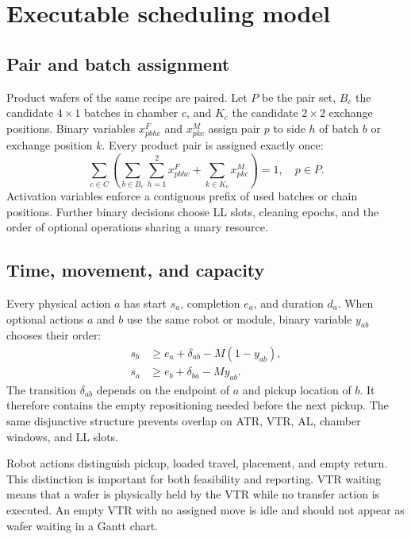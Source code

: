 \documentclass[5p,times,procedia]{elsarticle}
\begin{document}
\section{Executable scheduling model}

\subsection{Pair and batch assignment}

Product wafers of the same recipe are paired. Let $P$ be the pair set, $B_c$ the candidate $4\times1$ batches in chamber $c$, and $K_c$ the candidate $2\times2$ exchange positions. Binary variables $x^{F}_{pbhc}$ and $x^{M}_{pkc}$ assign pair $p$ to side $h$ of batch $b$ or exchange position $k$. Every product pair is assigned exactly once:
\begin{equation}
\sum_{c\in C}\left(\sum_{b\in B_c}\sum_{h=1}^{2}x^{F}_{pbhc}
+\sum_{k\in K_c}x^{M}_{pkc}\right)=1,\quad p\in P.
\label{eq:assignment}
\end{equation}
Activation variables enforce a contiguous prefix of used batches or chain positions. Further binary decisions choose LL slots, cleaning epochs, and the order of optional operations sharing a unary resource.

\subsection{Time, movement, and capacity}

Every physical action $a$ has start $s_a$, completion $e_a$, and duration $d_a$. When optional actions $a$ and $b$ use the same robot or module, binary variable $y_{ab}$ chooses their order:
\begin{align}
s_b &\ge e_a+\delta_{ab}-M(1-y_{ab}),\nonumber\\
s_a &\ge e_b+\delta_{ba}-My_{ab}.
\label{eq:disjunction}
\end{align}
The transition $\delta_{ab}$ depends on the endpoint of $a$ and pickup location of $b$. It therefore contains the empty repositioning needed before the next pickup. The same disjunctive structure prevents overlap on ATR, VTR, AL, chamber windows, and LL slots.

Robot actions distinguish pickup, loaded travel, placement, and empty return. This distinction is important for both feasibility and reporting. VTR waiting means that a wafer is physically held by the VTR while no transfer action is executed. An empty VTR with no assigned move is idle and should not appear as wafer waiting in a Gantt chart.
\end{document}
